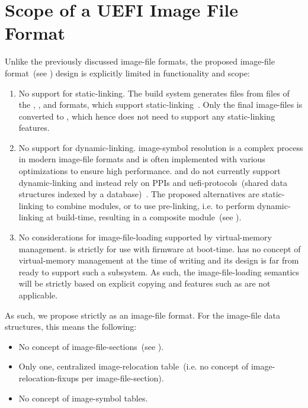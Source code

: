 \section{Scope of a UEFI Image File Format}
\label{sec:ue_scope}

Unlike the previously discussed \gls{image-file} formats, the proposed  \gls{image-file} format~(see ) design is explicitly limited in functionality and scope:
\begin{enumerate}
  \item No support for \gls{static-linking}. The build system generates  files from files of the , , and  formats, which support \gls{static-linking}~\cite{elf-spec,macho-spec,pe-format}. Only the final \glspl{image-file} is converted to , which hence does not need to support any \gls{static-linking} features.
  \item No support for \gls{dynamic-linking}. \Gls{image-symbol} resolution is a complex process in modern \gls{image-file} formats and is often implemented with various optimizations to ensure high performance.  and  do not currently support \gls{dynamic-linking} and instead rely on \glspl{PPI} and \glspl{uefi-protocol}~(shared data structures indexed by a database)~\cite{pi-spec,uefi-spec}.
  The proposed alternatives are \gls{static-linking} to combine modules, or to use pre-linking, i.e. to perform \gls{dynamic-linking} at build-time, resulting in a composite module~(see ).
  \item No considerations for \gls{image-file-loading} supported by \gls{virtual-memory} management.  is strictly for use with \gls{firmware} at boot-time.  has no concept of \gls{virtual-memory} management at the time of writing and its design is far from ready to support such a subsystem. As such, the \gls{image-file-loading} semantics will be strictly based on explicit copying and features such as  are not applicable.
\end{enumerate}

As such, we propose  strictly as an \gls{image-file} format. For the \gls{image-file} data structures, this means the following:

\begin{itemize}
  \item No concept of \glspl{image-file-section}~(see ).
  \item Only one, centralized \gls{image-relocation} table~(i.e. no concept of \glspl{image-relocation-fixup} per \gls{image-file-section}).
  \item No concept of \gls{image-symbol} tables.
\end{itemize}

